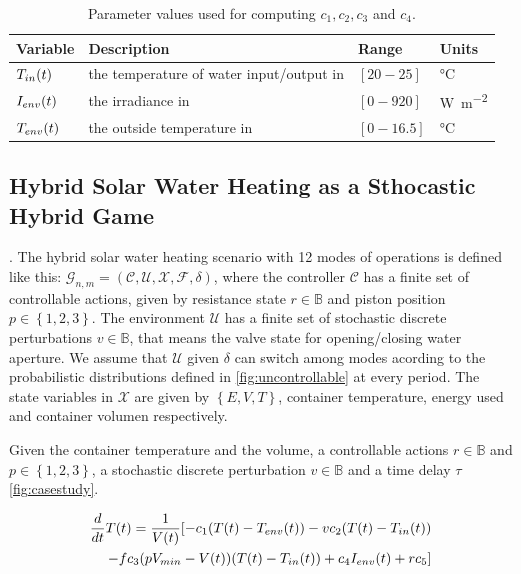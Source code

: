\begin{table}[hbt!]
\begin{tabular}{ |p{2cm}||p{6cm}|p{2cm}|p{2cm}|  }
          \hline
          Variable& Description & Range&Units\\
          \hline
          $T_{in}(t)$ & the temperature of water input/output in & $[20-25]$ & \si{\degreeCelsius} \\
          $I_{env}(t)$ & the irradiance in & $[0-920]$ & \si{\watt\per\square\metre}    \\
          $T_{env}(t)$ & the outside temperature in & $[0-16.5]$ & \si{\degreeCelsius} \\
          \hline
      \end{tabular}
      \caption{Parameter values used for computing $c_1,c_2, c_3$ and $c_4$.}
      \label{data-table}
      \end{table}
      \clearpage
    \subsection{Hybrid Solar Water Heating as a Sthocastic Hybrid Game}.
      The hybrid solar water heating scenario with 12 modes of operations is
      defined  like this: $\mathcal{G}_{n,m} = (\mathcal{C,U,X,F},\delta)$, 
      where the controller $\mathcal{C}$ has a finite set of controllable actions,
      given by resistance state ${r \in \mathbb{B}}$ and piston position $p \in 
      \left\lbrace1,2,3\right\rbrace $. The environment $\mathcal{U}$ has a finite  
      set of stochastic discrete perturbations $v \in \mathbb{B} $, that means the valve state 
      for opening/closing water aperture. We assume that $\mathcal{U}$ given 
      $\delta$ can switch among modes acording to the probabilistic distributions 
      defined in \autoref{fig:uncontrollable} at every period. 
      The state variables in $\mathcal{X}$ are given by $\left\lbrace 
      E,V,T \right\rbrace $, container temperature, energy used and container 
      volumen respectively.

      Given the container temperature and the volume, a controllable 
      actions $r \in \mathbb{B}$ and $p \in \left\lbrace1,2,3\right\rbrace$,
      a stochastic discrete perturbation $v \in \mathbb{B} $ and a 
      time delay $\tau$ \autoref{fig:casestudy}.

      \begin{equation}
        \begin{aligned}
          \frac{d}{dt}T(t) = \frac{1}{V(t)} [ -c_1(T(t)-T_{env}(t))
          - v c_{2}(T(t)-T_{in}(t)) \\
          - f c_{3}(pV_{min} - V(t))(T(t)-T_{in}(t))
          + c_{4}I_{env}(t) + 
          r c_{5} ]
        \end{aligned}
        \label{eq:temperature-equation}
      \end{equation}


